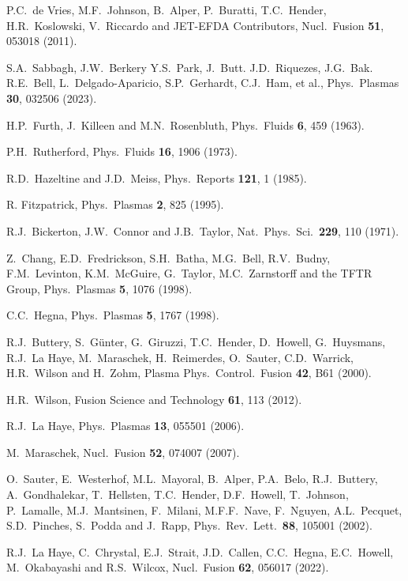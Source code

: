 \documentclass{iopjournal}
\begin{document}
{\begin{thebibliography}{99}
 P.C.~de Vries, M.F.~Johnson, B.~Alper, P.~Buratti, T.C.~Hender, H.R.~Koslowski, V.~Riccardo and JET-EFDA Contributors,  Nucl.\ Fusion {\bf 51},  053018 (2011).

 S.A.~Sabbagh, J.W.~Berkery  Y.S.~Park, J.~Butt. J.D.~Riquezes, J.G.~Bak. R.E.~Bell, L.~Delgado-Aparicio, S.P.~Gerhardt, C.J.~Ham,
et al., Phys.\ Plasmas {\bf 30}, 032506 (2023).

 H.P.~Furth,  J.~Killeen and M.N.~Rosenbluth,  Phys.\ Fluids {\bf 6}, 459 (1963).

 P.H.~Rutherford, Phys.\ Fluids {\bf 16}, 1906 (1973).

 R.D.~Hazeltine and J.D.~Meiss, Phys.\ Reports {\bf 121}, 1 (1985).

 R. Fitzpatrick, Phys.\ Plasmas {\bf 2}, 825 (1995).

 R.J.~Bickerton, J.W.~Connor and J.B.~Taylor, Nat.\ Phys.\ Sci.\ {\bf 229}, 110 (1971). 

 Z.~Chang,  E.D.~Fredrickson, S.H.~Batha,  M.G.~Bell,  R.V.~Budny,  F.M.~Levinton, K.M.~McGuire, G.~Taylor,  M.C.~Zarnstorff and the  TFTR Group, Phys.\ Plasmas {\bf 5}, 1076  (1998).

 C.C.~Hegna, Phys.\ Plasmas {\bf 5}, 1767 (1998).

 R.J.~Buttery, S.~G\"{u}nter, G.~Giruzzi, T.C.~Hender, D.~Howell, G.~Huysmans, R.J.~La Haye, M.~Maraschek, H.~Reimerdes, O.~Sauter,
 C.D.~Warrick, H.R.~Wilson and H.~Zohm, Plasma Phys.\ Control.\ Fusion {\bf 42}, B61 (2000).
 
 H.R.~Wilson, Fusion Science and Technology {\bf 61},  113 (2012). 
 
 R.J.~La Haye, Phys.\ Plasmas {\bf 13}, 055501 (2006).

 M.~Maraschek, Nucl.\ Fusion {\bf 52}, 074007 (2007). 

 O.~Sauter, E.~Westerhof, M.L.~Mayoral, B.~Alper, P.A.~Belo, R.J.~Buttery, A.~Gondhalekar, T.~Hellsten, T.C.~Hender, 
D.F.~Howell, T.~Johnson, P.~Lamalle, M.J.~Mantsinen, F.~Milani, M.F.F.~Nave, F.~Nguyen, A.L.~Pecquet, S.D.~Pinches, S.~Podda and J.~Rapp,
Phys.\ Rev.\ Lett.\ {\bf 88}, 105001 (2002).

 R.J.~La Haye, C.~Chrystal, E.J.~Strait, J.D.~Callen, C.C.~Hegna, E.C.~Howell, M.~Okabayashi and R.S.~Wilcox, Nucl.\ Fusion {\bf 62}, 056017 (2022).


\end{thebibliography}}
\end{document}
